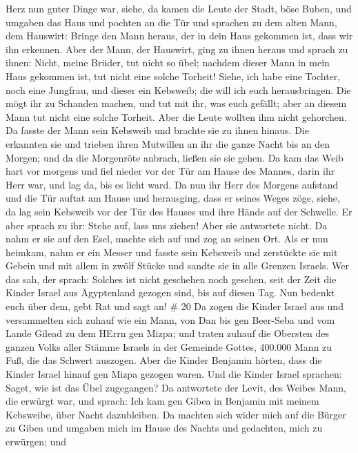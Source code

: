Herz nun guter Dinge war, siehe, da kamen die Leute der Stadt, böse
Buben, und umgaben das Haus und pochten an die Tür und sprachen zu dem
alten Mann, dem Hauswirt: Bringe den Mann heraus, der in dein Haus
gekommen ist, dass wir ihn erkennen.  Aber der Mann, der
Hauswirt, ging zu ihnen heraus und sprach zu ihnen: Nicht, meine Brüder,
tut nicht so übel; nachdem dieser Mann in mein Haus gekommen ist, tut
nicht eine solche Torheit!  Siehe, ich habe eine Tochter,
noch eine Jungfrau, und dieser ein Kebsweib; die will ich euch
herausbringen. Die mögt ihr zu Schanden machen, und tut mit ihr, was
euch gefällt; aber an diesem Mann tut nicht eine solche Torheit.
 Aber die Leute wollten ihm nicht gehorchen. Da fasste der
Mann sein Kebsweib und brachte sie zu ihnen hinaus. Die erkannten sie
und trieben ihren Mutwillen an ihr die ganze Nacht bis an den Morgen;
und da die Morgenröte anbrach, ließen sie sie gehen.  Da
kam das Weib hart vor morgens und fiel nieder vor der Tür am Hause des
Mannes, darin ihr Herr war, und lag da, bis es licht ward. 
Da nun ihr Herr des Morgens aufstand und die Tür auftat am Hause und
herausging, dass er seines Weges zöge, siehe, da lag sein Kebsweib vor
der Tür des Hauses und ihre Hände auf der Schwelle.  Er
aber sprach zu ihr: Stehe auf, lass uns ziehen! Aber sie antwortete
nicht. Da nahm er sie auf den Esel, machte sich auf und zog an seinen
Ort.  Als er nun heimkam, nahm er ein Messer und fasste
sein Kebsweib und zerstückte sie mit Gebein und mit allem in zwölf
Stücke und sandte sie in alle Grenzen Israels.  Wer das
sah, der sprach: Solches ist nicht geschehen noch gesehen, seit der Zeit
die Kinder Israel aus Ägyptenland gezogen sind, bis auf diesen Tag. Nun
bedenkt euch über dem, gebt Rat und sagt an! \# 20  Da zogen
die Kinder Israel aus und versammelten sich zuhauf wie ein Mann, von Dan
bis gen Beer-Seba und vom Lande Gilead zu dem HErrn gen Mizpa;
 und traten zuhauf die Obersten des ganzen Volks aller
Stämme Israels in der Gemeinde Gottes, 400.000 Mann zu Fuß, die das
Schwert auszogen.  Aber die Kinder Benjamin hörten, dass die
Kinder Israel hinauf gen Mizpa gezogen waren. Und die Kinder Israel
sprachen: Saget, wie ist das Übel zugegangen?  Da antwortete
der Levit, des Weibes Mann, die erwürgt war, und sprach: Ich kam gen
Gibea in Benjamin mit meinem Kebsweibe, über Nacht dazubleiben.
 Da machten sich wider mich auf die Bürger zu Gibea und
umgaben mich im Hause des Nachts und gedachten, mich zu erwürgen; und
